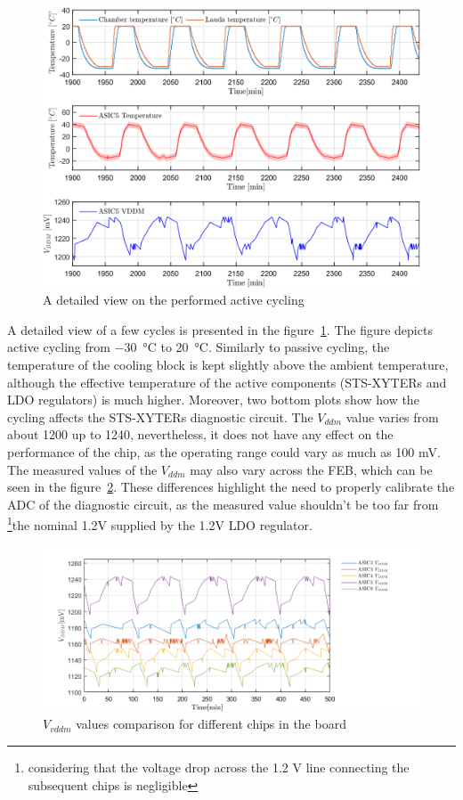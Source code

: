 \begin{figure}[!h]
\centering
\includegraphics[width=0.57\columnwidth]{Chapter4/images/FEB0ASIC5COMP.png}
\caption{A detailed view on the performed active cycling}
\label{fig_active_detailed}
\end{figure}

A detailed view of a few cycles is presented in the figure~\ref{fig_active_detailed}. The figure depicts active cycling from \SI{-30}{\celsius} to \SI{20}{\celsius}. Similarly to passive cycling, the temperature of the cooling block is kept slightly above the ambient temperature, although the effective temperature of the active components (STS-XYTERs and \gls{LDO} regulators) is much higher. Moreover, two bottom plots show how the cycling affects the STS-XYTERs diagnostic circuit. The $V_{ddm}$ value varies from about 1200 up to 1240, nevertheless, it does not have any effect on the performance of the chip, as the operating range could vary as much as 100 mV. The measured values of the $V_{ddm}$ may also vary across the \gls{FEB}, which can be seen in the figure~\ref{feb_vary}. These differences highlight the need to properly calibrate the ADC of the diagnostic circuit, as the measured value shouldn't be too far from \footnote{considering that the voltage drop across the 1.2 V line connecting the subsequent chips is negligible}{the nominal 1.2V} supplied by the 1.2V \gls{LDO} regulator. 
\begin{figure}[!h]
\centering
\includegraphics[width=0.9\columnwidth]{Chapter4/images/vddm_comp.png}
\caption{$V_{vddm}$ values comparison for different chips in the board}
\label{feb_vary}
\end{figure}

